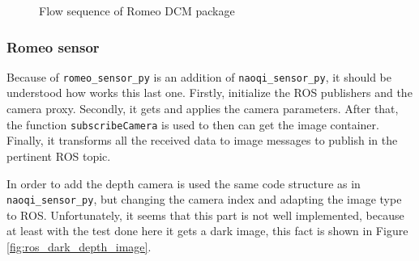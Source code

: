 \documentclass[12pt,a4paper,final,twoside,openright]{report}
\begin{document}
\begin{figure}[h]
\centering

\caption{Flow sequence of Romeo DCM package\label{fig:dcm_driver_flow}}
\end{figure}

\newpage
\subsubsection{Romeo sensor}


Because of \texttt{romeo\_sensor\_py} is an addition of \texttt{naoqi\_sensor\_py}, it should be understood how works this last one. Firstly, initialize the ROS publishers and the camera proxy. Secondly, it gets and applies the camera parameters. After that, the function \texttt{subscribeCamera} is used to then can get the image container. Finally, it transforms all the received data to image messages to publish in the pertinent ROS topic. 

In order to add the depth camera is used the same code structure as in \texttt{naoqi\_sensor\_py}, but changing the camera index and adapting the image type to ROS. Unfortunately, it seems that this part is not well implemented, because at least with the test done here it gets a dark image, this fact is shown in Figure \ref{fig:ros_dark_depth_image}.  
\end{document}
